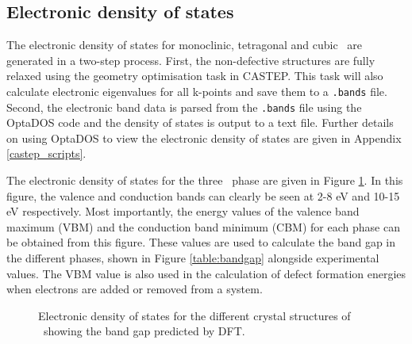 \subsection{Electronic density of states} 

The electronic density of states for monoclinic, tetragonal and cubic \zirconia\ are generated in a two-step process. First, the non-defective structures are fully relaxed using the geometry optimisation task in CASTEP. This task will also calculate electronic eigenvalues for all k-points and save them to a \texttt{.bands} file. Second, the electronic band data is parsed from the \texttt{.bands} file using the OptaDOS code \cite{Nicholls2012, Morris2014} and the density of states is output to a text file. Further details on using OptaDOS to view the electronic density of states are given in Appendix \ref{castep_scripts}.

The electronic density of states for the three \zirconia\ phase are given in Figure \ref{figure:densityofstates}. In this figure, the valence and conduction bands can clearly be seen at 2-8 eV and 10-15 eV respectively. Most importantly, the energy values of the valence band maximum (VBM) and the conduction band minimum (CBM) for each phase can be obtained from this figure. These values are used to calculate the band gap in the different phases, shown in Figure \ref{table:bandgap} alongside experimental values. The VBM value is also used in the calculation of defect formation energies when electrons are added or removed from a system.

\begin{figure}[ht] %
\begin{center}
		\caption{Electronic density of states for the different crystal structures of \zirconia\ showing the band gap predicted by DFT.}
		\label{figure:densityofstates}
	\end{center}
\end{figure}

